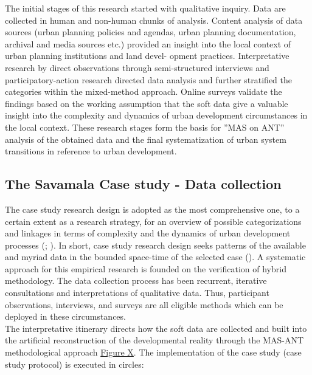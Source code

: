 \documentclass[11pt]{report}
\begin{document}
The initial stages of this research started with qualitative inquiry. Data are collected in human and non-human chunks of analysis. Content analysis of data sources (urban planning policies and agendas, urban planning documentation, archival and media sources etc.) provided an insight into the local context of urban planning institutions and land devel- opment practices. Interpretative research by direct observations through semi-structured interviews and participatory-action research directed data analysis and further stratified the categories within the mixed-method approach. Online surveys validate the findings based on the working assumption that the soft data give a valuable insight into the complexity and dynamics of urban development circumstances in the local context. These research stages form the basis for ”MAS on ANT” analysis of the obtained data and the final systematization of urban system transitions in reference to urban development.

\subsection{The Savamala Case study - Data collection} \label{sec:predis}

The case study research design is adopted as the most comprehensive one, to a certain extent as a research strategy, for an overview of possible categorizations and linkages in terms of complexity and the dynamics of urban development processes  (\href{Meredith}{\citealt{meredith_theory_1993}}; \href{Harrison}{\citealt{partington_case_2002}}). In short, case study research design seeks patterns of the available and myriad data in the bounded space-time of the selected case (\href{Denzin}{\cite{denzin_research_2009}}). A systematic approach for this empirical research is founded on the verification of hybrid methodology. The data collection process has been recurrent, iterative consultations and interpretations of qualitative data. 
Thus, participant observations, interviews, and surveys are all eligible methods which can be deployed in these circumstances.
\\
The interpretative itinerary directs how the soft data are collected and built into the artificial reconstruction of the developmental reality through the MAS-ANT methodological approach \href{Figure xxx}{Figure X}. The implementation of the case study (case study protocol) is executed in circles:
\end{document}
